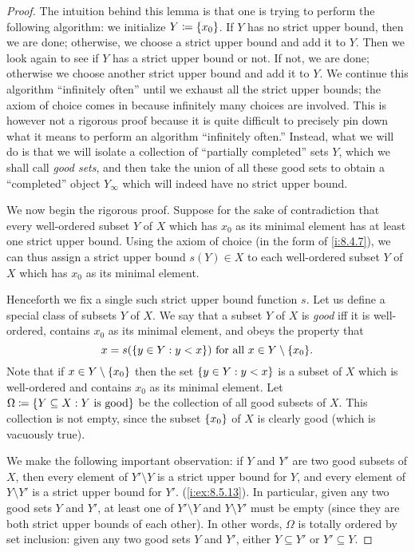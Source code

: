 \begin{proof}
  The intuition behind this lemma is that one is trying to perform the following algorithm:
  we initialize \(Y \coloneqq \left\lbrace x_0\right\rbrace\).
  If \(Y\) has no strict upper bound, then we are done;
  otherwise, we choose a strict upper bound and add it to \(Y\).
  Then we look again to see if \(Y\) has a strict upper bound or not.
  If not, we are done;
  otherwise we choose another strict upper bound and add it to \(Y\).
  We continue this algorithm ``infinitely often'' until we exhaust all the strict upper bounds;
  the axiom of choice comes in because infinitely many choices are involved.
  This is however not a rigorous proof because it is quite difficult to precisely pin down what it means to perform an algorithm ``infinitely often.''
  Instead, what we will do is that we will isolate a collection of ``partially completed'' sets \(Y\), which we shall call \emph{good sets}, and then take the union of all these good sets to obtain a ``completed'' object \(Y_{\infty}\) which will indeed have no strict upper bound.

  We now begin the rigorous proof.
  Suppose for the sake of contradiction that every well-ordered subset \(Y\) of \(X\) which has \(x_0\) as its minimal element has at least one strict upper bound.
  Using the axiom of choice (in the form of \cref{i:8.4.7}), we can thus assign a strict upper bound \(s(Y) \in X\) to each well-ordered subset \(Y\) of \(X\) which has \(x_0\) as its minimal element.

  Henceforth we fix a single such strict upper bound function \(s\).
  Let us define a special class of subsets \(Y\) of \(X\).
  We say that a subset \(Y\) of \(X\) is \emph{good} iff it is well-ordered, contains \(x_0\) as its minimal element, and obeys the property that
  \[
    x = s(\set{y \in Y : y < x}) \text{ for all } x \in Y \setminus \set{x_0}.
  \]
  Note that if \(x \in Y \setminus \left\lbrace x_0\right\rbrace\) then the set \(\left\lbrace y \in Y : y < x\right\rbrace\) is a subset of \(X\) which is well-ordered and contains \(x_0\) as its minimal element.
  Let \(\Omega \coloneqq \left\lbrace Y \subseteq X : Y \text{ is good}\right\rbrace\) be the collection of all good subsets of \(X\).
  This collection is not empty, since the subset \(\left\lbrace x_0\right\rbrace\) of \(X\) is clearly good
  (which is vacuously true).

  We make the following important observation:
  if \(Y\) and \(Y'\) are two good subsets of \(X\), then every element of \(Y' \setminus Y\) is a strict upper bound for \(Y\), and every element of \(Y \setminus Y'\) is a strict upper bound for \(Y'\).
  (\cref{i:ex:8.5.13}).
  In particular, given any two good sets \(Y\) and \(Y'\), at least one of \(Y' \setminus Y\) and \(Y \setminus Y'\) must be empty
  (since they are both strict upper bounds of each other).
  In other words, \(\Omega\) is totally ordered by set inclusion:
  given any two good sets \(Y\) and \(Y'\), either \(Y \subseteq Y'\) or \(Y' \subseteq Y\).


\end{proof}
